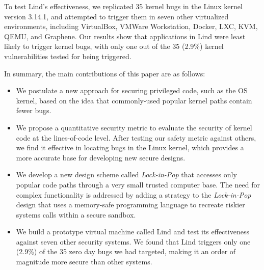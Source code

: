 To test Lind's effectiveness, we replicated 35 kernel bugs in the Linux kernel version 3.14.1,
and attempted to trigger them in seven other virtualized environments,
including VirtualBox, VMWare Workstation,
Docker, LXC, KVM, QEMU, and Graphene.
Our results show that applications in Lind were least likely to trigger kernel bugs,
with only one out of the 35 (2.9\%) kernel vulnerabilities tested for being triggered.

In summary, the main contributions of this paper are as follows:

\begin{itemize}\setlength\itemsep{0em}
\item
We postulate a new approach for securing privileged code,
such as the OS kernel, based on the idea that commonly-used popular kernel paths contain fewer bugs.

\item
We propose a quantitative security metric to evaluate the security of kernel code
 at the lines-of-code level.
After testing our safety metric against others, we find it effective in locating
 bugs in the Linux kernel,
which provides a more accurate base for developing new secure designs.

\item
We develop a new design scheme called \emph{Lock-in-Pop} that accesses only popular code paths
through a very small trusted computer base.
The need for complex functionality is addressed by adding a strategy to the \emph{Lock-in-Pop} design that
uses a memory-safe programming language to recreate riskier systems calls within a secure sandbox.

\item
We build a prototype virtual machine called Lind and test its effectiveness
against seven other security systems. We found that Lind triggers only one
(2.9\%) of the 35 zero day bugs we had targeted,
making it an order of magnitude more secure than other systems.
\end{itemize}

%
